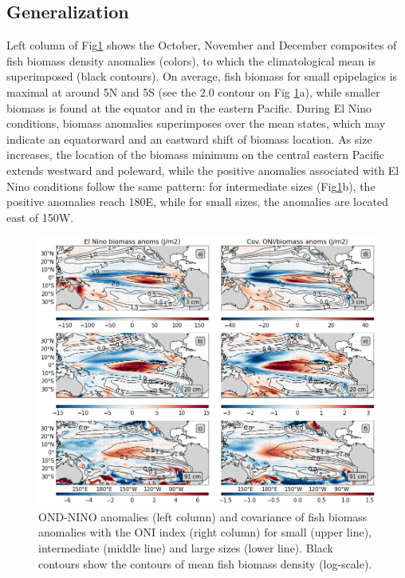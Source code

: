 \subsection{Generalization}

Left column of Fig\ref{fig:mean_ond97_ape} shows the October, November and December composites of fish biomass density anomalies (colors), to which the climatological mean is superimposed (black contours). On average, fish biomass for small epipelagics is maximal at around 5\degree{}N and 5\degree{}S (see the $2.0$ contour on Fig \ref{fig:mean_ond97_ape}a), while smaller biomass is found at the equator and in the eastern Pacific. During El Nino conditions, biomass anomalies superimposes over the mean states, which may indicate an equatorward and an eastward shift of biomass location.
As size increases, the location of the biomass minimum on the central eastern Pacific extends westward and poleward, while the positive anomalies associated with El Nino conditions follow the same pattern: for intermediate sizes (Fig\ref{fig:mean_ond97_ape}b), the positive anomalies reach 180\degree{}E, while for small sizes, the anomalies are located east of 150\degree{}W. 

\begin{figure}[h!tp]
	\centering
	\includegraphics[scale=0.4]{figs/map_mean_anom_OND_97.png}	
	\caption{OND-NINO anomalies (left column) and covariance of fish biomass anomalies with the ONI index (right column) for small (upper line), intermediate (middle line) and large sizes (lower line). Black contours show the contours of mean fish biomass density (log-scale).}	
	\label{fig:mean_ond97_ape}
\end{figure}

